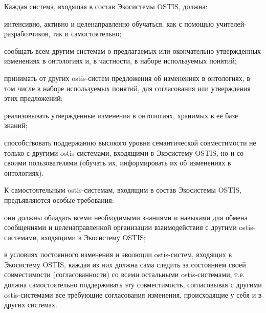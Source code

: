 Каждая система, входящая в состав Экосистемы OSTIS, должна:
\begin{textitemize}
    \item интенсивно, активно и целенаправленно обучаться, как с помощью учителей-разработчиков, так и самостоятельно;
    \item сообщать всем другим системам о предлагаемых или окончательно утвержденных изменениях в онтологиях и, в частности, в наборе используемых понятий;
    \item принимать от других ostis-систем предложения об изменениях в онтологиях, в том числе в наборе используемых понятий, для согласования или утверждения этих предложений;
    \item реализовывать утвержденные изменения в онтологиях, хранимых в ее базе знаний;
    \item способствовать поддержанию высокого уровня семантической совместимости не только с другими ostis-системами, входящими в Экосистему OSTIS, но и со своими пользователями (обучать их, информировать их об изменениях в онтологиях).
\end{textitemize}

К самостоятельным ostis-системам, входящим в состав Экосистемы OSTIS, предъявляются особые требования:
\begin{textitemize}
    \item они должны обладать всеми необходимыми знаниями и навыками для обмена сообщениями и целенаправленной организации взаимодействия с другими ostis-системами, входящими в Экосистему OSTIS;
    \item в условиях постоянного изменения и эволюции ostis-систем, входящих в Экосистему OSTIS, каждая из них должна сама следить за состоянием своей совместимости (согласованности) со всеми остальными ostis-системами, т.е. должна самостоятельно поддерживать эту совместимость, согласовывая с другими ostis-системами все требующие согласования изменения, происходящие у себя и в других системах.
\end{textitemize}


